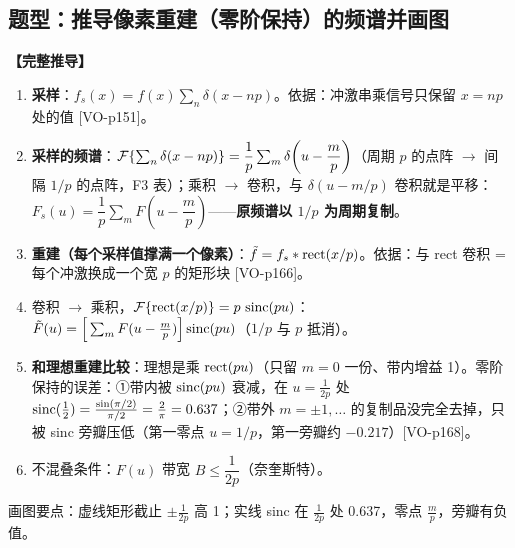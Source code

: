\subsection{题型：推导像素重建（零阶保持）的频谱并画图}\label{sec:zoh}
\textbf{【完整推导】}
\begin{enumerate}
\item \textbf{采样}：$f_s(x)=f(x)\sum_n\delta(x-np)$。依据：冲激串乘信号只保留 $x=np$ 处的值 [VO-p151]。
\item \textbf{采样的频谱}：$\mathcal{F}\{\sum_n\delta(x-np)\}=\dfrac1p\sum_m\delta\!\left(u-\dfrac mp\right)$（周期 $p$ 的点阵 $\to$ 间隔 $1/p$ 的点阵，F3 表）；乘积 $\to$ 卷积，与 $\delta(u-m/p)$ 卷积就是平移：$F_s(u)=\dfrac1p\sum_mF\!\left(u-\dfrac mp\right)$——\textbf{原频谱以 $1/p$ 为周期复制}。
\item \textbf{重建（每个采样值撑满一个像素）}：$\tilde f=f_s\ast\operatorname{rect}(x/p)$。依据：与 rect 卷积 = 每个冲激换成一个宽 $p$ 的矩形块 [VO-p166]。
\item 卷积 $\to$ 乘积，$\mathcal{F}\{\operatorname{rect}(x/p)\}=p\,\operatorname{sinc}(pu)$：$\tilde F(u)=\Big[\sum_mF(u-\tfrac mp)\Big]\operatorname{sinc}(pu)$（$1/p$ 与 $p$ 抵消）。
\item \textbf{和理想重建比较}：理想是乘 $\operatorname{rect}(pu)$（只留 $m=0$ 一份、带内增益 1）。零阶保持的误差：①带内被 $\operatorname{sinc}(pu)$ 衰减，在 $u=\frac1{2p}$ 处 $\operatorname{sinc}(\frac12)=\frac{\sin(\pi/2)}{\pi/2}=\frac2\pi=0.637$；②带外 $m=\pm1,\dots$ 的复制品没完全去掉，只被 sinc 旁瓣压低（第一零点 $u=1/p$，第一旁瓣约 $-0.217$）[VO-p168]。
\item 不混叠条件：$F(u)$ 带宽 $B\le\dfrac1{2p}$（奈奎斯特）。
\end{enumerate}

\begin{center}

{\scriptsize 画图要点：虚线矩形截止 $\pm\frac1{2p}$ 高 1；实线 sinc 在 $\frac1{2p}$ 处 0.637，零点 $\frac mp$，旁瓣有负值。}
\end{center}

